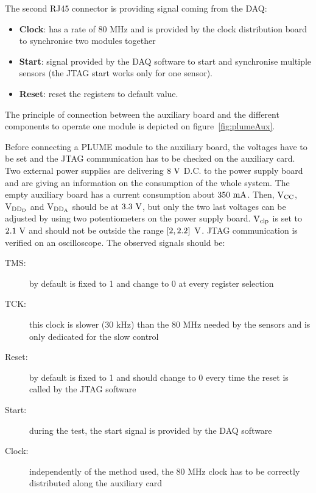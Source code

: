   The second RJ45 connector is providing signal coming from the \gls{DAQ}:
  \begin{itemize}
    \item \textbf{Clock}: has a rate of 80 MHz and is provided by the clock distribution board to synchronise two modules together
    \item \textbf{Start}: signal provided by the \gls{DAQ} software to start and synchronise multiple sensors (the \gls{JTAG} start works only for one sensor).
    \item \textbf{Reset}: reset the registers to default value. 
  \end{itemize}

  The principle of connection between the auxiliary board and the different components to operate one module is depicted on figure~\ref{fig:plumeAux}.

  Before connecting a PLUME module to the auxiliary board, the voltages have to be set and the \gls{JTAG} communication has to be checked on the auxiliary card.
  Two external power supplies are delivering $8~\rm{V}$ D.C. to the power supply board and are giving an information on the consumption of the whole system.
  The empty auxiliary board has a current consumption about $350~\rm{mA}$.
  Then, $\rm{V}_{\rm{CC}}$, $\rm{V}_{\rm{DD_D}}$ and $\rm{V}_{\rm{DD_A}}$ should be at $3.3~\rm{V}$, but only the two last voltages can be adjusted by using two potentiometers on the power supply board.
  $\rm{V}_{\rm{clp}}$ is set to $2.1~\rm{V}$ and should not be outside the range $\left[2, 2.2\right]~\rm{V}$.
  \gls{JTAG} communication is verified on an oscilloscope.
  The observed signals should be:

  \begin{description}
    \item[\gls{TMS}:] by default is fixed to 1 and change to 0 at every register selection
    \item[\gls{TCK}:] this clock is slower (30 kHz) than the 80 MHz needed by the sensors and is only dedicated for the slow control
    \item[Reset:] by default is fixed to 1 and should change to 0 every time the reset is called by the \gls{JTAG} software
    \item[Start:] during the test, the start signal is provided by the \gls{DAQ} software
    \item[Clock:] independently of the method used, the 80 MHz clock has to be correctly distributed along the auxiliary card
  \end{description}

